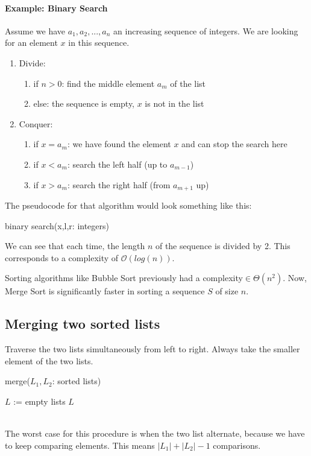 \documentclass[10pt,a4paper]{book}
\begin{document}
\paragraph*{Example: Binary Search}
Assume we have $a_1,a_2,...,a_n$ an increasing sequence of integers. We are looking for an element $x$ in this sequence.
\begin{enumerate}
\item Divide:
\begin{enumerate}
\item if $n>0$: find the middle element $a_m$ of the list
\item else: the sequence is empty, $x$ is not in the list
\end{enumerate}
\item Conquer:
\begin{enumerate}
\item if $x=a_m$: we have found the element $x$ and can stop the search here
\item if $x<a_m$: search the left half (up to $a_{m-1}$)
\item if $x>a_m$: search the right half (from $a_{m+1}$ up)
\end{enumerate}
\end{enumerate}
The pseudocode for that algorithm would look something like this:
\begin{procedure}
\caption{binary search(x,l,r: integers)}
\DontPrintSemicolon
\SetAlgoNoEnd
{}
\end{procedure}
We can see that each time, the length $n$ of the sequence is divided by 2. This corresponds to a complexity of $\mathcal{O}(log(n))$.\par 
Sorting algorithms like Bubble Sort previously had a complexity$\in \Theta(n^2)$. Now, Merge Sort is significantly faster in sorting a sequence $S$ of size $n$.
\subsection{Merging two sorted lists}
Traverse the two lists simultaneously from left to right. Always take the smaller element of the two lists.
\begin{procedure}
\caption{merge($L_1,L_2$: sorted lists)}
\DontPrintSemicolon
\SetAlgoNoEnd
$L$ := empty lists
\KwRet $L$
\end{procedure}\\
The worst case for this procedure is when the two list alternate, because we have to keep comparing elements. This means $|L_1|+|L_2|-1$ comparisons.
\end{document}
